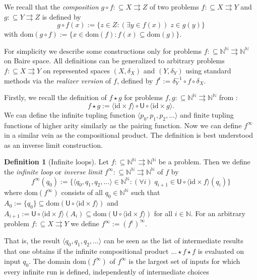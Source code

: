 \documentclass[11pt,a4paper]{amsart}
\theoremstyle{plain}
\theoremstyle{definition}
\newtheorem{defi}[thm]{Definition}
\theoremstyle{defC}
\theoremstyle{thmC}
\theoremstyle{plain}
\numberwithin{equation}{section}
\def\r{\mathrm{r}}
\def\IN{{\mathbb{N}}}
\def\In{\subseteq}
\def\mto{\rightrightarrows}
\def\U{{\mathsf{{U}}}}
\def\r{\mathrm{r}}
\def\id{{\mathrm{id}}}
\def\dom{{\mathrm{dom}}}
\begin{document}
We recall that the {\em composition} $g\circ f:\In X\mto Z$ of two problems $f:\In X\mto Y$ and $g:\In Y\mto Z$
is defined by 
\[g\circ f(x):=\{z\in Z:(\exists y\in f(x))\;z\in g(y)\}\]
with $\dom(g\circ f):=\{x\in \dom(f):f(x)\In\dom(g)\}$.

For simplicity we describe some constructions only for problems $f:\In\IN^\IN\mto\IN^\IN$ on Baire space.
All definitions can be generalized to arbitrary problems ${f:\In X\mto Y}$ on represented spaces $(X,\delta_X)$ and $(Y,\delta_Y)$ using standard methods
via the {\em realizer version} of $f$, defined by $f^\r:=\delta_Y^{-1}\circ f\circ\delta_X$.

Firstly, we recall the definition of $f\star g$ for problems $f,g:\In\IN^\IN\mto\IN^\IN$ from \cite{BGP21}:
\[f\star g:=\langle \id\times f\rangle \circ \U\circ\langle \id\times g\rangle.\]
We can define the infinite tupling function 
$\langle p_0,p_1,p_2,...\rangle$ and finite tupling functions of higher arity similarly as the pairing function.
Now we can define $f^\infty$ in a similar vein as the compositional product.
The definition is best understood as an inverse limit construction.

\begin{defi}[Infinite loops]
Let $f:\In\IN^\IN\mto\IN^\IN$ be a problem. Then we define
the {\em infinite loop} or {\em inverse limit} $f^\infty:\In\IN^\IN\mto\IN^\IN$ of $f$
by
\[f^\infty(q_0):=\{\langle q_0,q_1,q_2,...\rangle\in\IN^\IN:(\forall i)\;q_{i+1}\in \U\circ\langle \id\times f\rangle(q_i)\}\]
where $\dom(f^\infty)$ consists of all $q_0\in\IN^\IN$ such that
$A_0:=\{q_0\}\In\dom(\U\circ\langle\id\times f\rangle)$ and $A_{i+1}:=\U\circ\langle \id\times f\rangle(A_i)\In\dom(\U\circ\langle\id\times f\rangle)$ for all $i\in\IN$.
For an arbitrary problem $f:\In X\mto Y$ we define $f^\infty:=(f^\r)^\infty$.
\end{defi}

\noindent
That is, the result $\langle q_0,q_1,q_2,...\rangle$ can be seen as the list of intermediate results
that one obtains if the infinite compositional product $...\star f\star f$ is evaluated on input $q_0$.
The domain $\dom(f^\infty)$ of $f^\infty$ is the largest set of inputs for which every infinite run is defined, independently of intermediate choices
\end{document}
